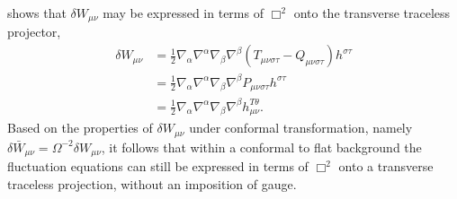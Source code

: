\documentclass[10pt,letterpaper]{article}
\begin{document}
shows that $\delta W_{\mu\nu}$ may be expressed in terms of $\Box^2$ onto the transverse traceless projector,
\begin{align}
\delta W_{\mu\nu} &= \frac12 \nabla_\alpha\nabla^\alpha \nabla_\beta\nabla^\beta( T_{\mu\nu\sigma\tau}-Q_{\mu\nu\sigma\tau})h^{\sigma\tau} \nonumber\\
&=\frac12  \nabla_\alpha\nabla^\alpha \nabla_\beta\nabla^\beta P_{\mu\nu\sigma\tau}h^{\sigma\tau}\nonumber\\
&= \frac12 \nabla_\alpha\nabla^\alpha \nabla_\beta\nabla^\beta h^{T\theta}_{\mu\nu}.
\end{align}
Based on the properties of $\delta W_{\mu\nu}$ under conformal transformation, namely $\delta \bar W_{\mu\nu} = \Omega^{-2} \delta W_{\mu\nu}$, it follows that within a conformal to flat background the fluctuation equations can still be expressed in terms of $\Box^2$ onto a transverse traceless projection, without an imposition of gauge. 
\\ \\
\end{document}

